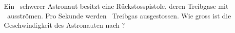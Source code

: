Ein \mAsO\ schwerer Astronaut besitzt eine Rückstosspistole, deren Treibgase mit \wGaO\ ausströmen. Pro Sekunde werden \qGaO\ Treibgas ausgestossen. Wie gross ist die Geschwindigkeit des Astronauten nach \tAsO?
